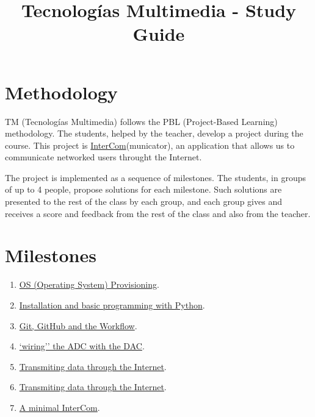 \title{Tecnologías Multimedia - Study Guide}

\maketitle

\section{Methodology}
TM (Tecnologías Multimedia) follows the PBL (Project-Based Learning) methodology. The students,
helped by the teacher, develop a project during the course. This
project
is \href{https://github.com/Tecnologias-multimedia/intercom}{InterCom}(municator),
an application that allows us to communicate networked users throught
the Internet.

The project is implemented as a sequence of milestones. The students,
in groups of up to 4 people, propose solutions for each
milestone. Such solutions are presented to the rest of the class by
each group, and each group gives and receives a score and feedback
from the rest of the class and also from the teacher.

\section{Milestones}
\begin{enumerate}
\item \href{https://tecnologias-multimedia.github.io/study_guide/milestone00/}{OS (Operating System) Provisioning}.
\item \href{https://tecnologias-multimedia.github.io/study_guide/milestone01/}{Installation and basic programming with Python}.
\item \href{https://tecnologias-multimedia.github.io/study_guide/milestone02/}{Git, GitHub and the Workflow}.
\item \href{https://tecnologias-multimedia.github.io/study_guide/milestone02/}{`wiring'' the ADC with the DAC}.
\item \href{https://tecnologias-multimedia.github.io/study_guide/milestone03/}{Transmiting data through the Internet}.
\item \href{https://tecnologias-multimedia.github.io/study_guide/milestone04/}{Transmiting data through the Internet}.
\item \href{https://tecnologias-multimedia.github.io/study_guide/milestone05/}{A minimal InterCom}.
\end{enumerate}

